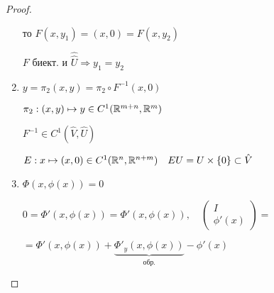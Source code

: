 \begin{proof}
\begin{enumerate}
                \par \quad то $F(x, y_1) = (x, 0) = F(x, y_2)$
                \par \quad \quad $F$ биект. и $\hat{\hat U} \Rightarrow y_1 = y_2$ %
            \item $y = \pi_2(x, y) = \pi_2 \circ F^{-1}(x, 0)$
                \par $\pi_2 : (x, y) \mapsto y \in C^1(\mathbb{R}^{m+n}, \mathbb{R}^m)$
                \par $F^{-1} \in C^1(\hat V, \hat U)$
                \par $E  : x \mapsto (x, 0) \in C^1(\mathbb{R}^n, \mathbb{R}^{n+m}) \quad EU = U \times \{0\} \subset \hat V$
            \item $\Phi(x, \phi(x)) = 0$
                \par $0 = \Phi'(x, \phi(x)) = \Phi'(x, \phi(x)), \quad \begin{pmatrix}I \\ \phi'(x)\end{pmatrix} =$
                \par $= \Phi'(x, \phi(x)) + \underbrace{\Phi'_y(x, \phi(x))}_{\text{обр.}} - \phi'(x)$ %
        \end{enumerate}
    \end{proof}

